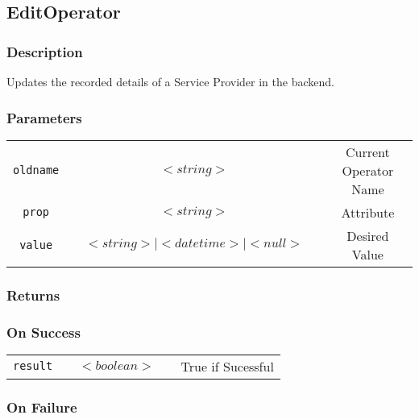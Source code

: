 \subsection{EditOperator}

\subsubsection{Description}

Updates the recorded details of a Service Provider in the backend.

\subsubsection{Parameters}

\begin{tabular}{ccccc}
\verb!oldname! & \vspace{15mm} & $<string>$ & \vspace{15mm} & Current Operator Name \\
\verb!prop! & \vspace{15mm} & $<string>$ 
& \vspace{15mm} & Attribute  \\
\verb!value! & \vspace{15mm} & $<string> \mid <datetime> \mid <null>$ & \vspace{15mm} & Desired Value \\
\end{tabular}

\subsubsection{Returns}

\subsubsection{On Success}

\begin{tabular}{ccccc}
\verb!result! & \vspace{15mm} & $<boolean>$ & \vspace{15mm} & True if Sucessful \\
\end{tabular}

\subsubsection{On Failure}


